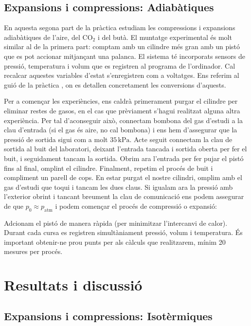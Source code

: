 \documentclass[a4paper,twoside,12pt]{article}
\theoremstyle{definition}
\begin{document}
	\subsection{Expansions i compressions: Adiabàtiques}
	
	En aquesta segona part de la pràctica estudiam les compressions i expansions adiabàtiques de l'aire, del CO$_2$ i del butà. El muntatge experimental és molt similar al de la primera part: comptam amb un cilindre més gran amb un pistó que es pot accionar mitjançant una palanca. El sistema té incorporats sensors de pressió, temperatura i volum que es registren al programa de l'ordinador. Cal recalcar aquestes variables d'estat s'enregistren com a voltatges. Ens referim al guió de la pràctica \cite{guio_practiques}, on es detallen concretament les conversions d'aquests.
	
	Per a començar les experiències, ens caldrà primerament purgar el cilindre per eliminar restes de gasos, en el cas que prèviament s'hagui realitzat alguna altra experiència. Per tal d'aconseguir això, connectam bombona del gas d’estudi a la clau d’entrada (si el gas és aire, no cal bombona) i ens hem d'assegurar que la pressió de sortida sigui com a molt \( 35\,\mathrm{kPa}\). Acte seguit connectam la clau de sortida al buit del laboratori, deixant l'entrada tancada i sortida oberta per fer el buit, i seguidament tancam la sortida. Obrim ara l’entrada per fer pujar el pistó fins al final, omplint el cilindre. Finalment, repetim el procés de buit i compliment un parell de cops. En estar purgat el nostre cilindri, omplim amb el gas d'estudi que toqui i tancam les dues claus. Si igualam ara la pressió amb l’exterior obrint i tancant breument la clau de comunicació ens podem assegurar de que \(p_0 \approx p_{\text{atm}}\) i podem començar el procés de compressió o expansió:
	
	Adcionam el pistó de manera ràpida (per minimitzar l’intercanvi de calor). Durant cada cursa es registren simultàniament pressió, volum i temperatura. És important obtenir-ne prou punts per als càlculs que realitzarem, mínim 20 mesures per procés. 
	
	\newpage
	
	
	\section{Resultats i discussió}
	\subsection{Expansions i compressions: Isotèrmiques}
	
\end{document}
